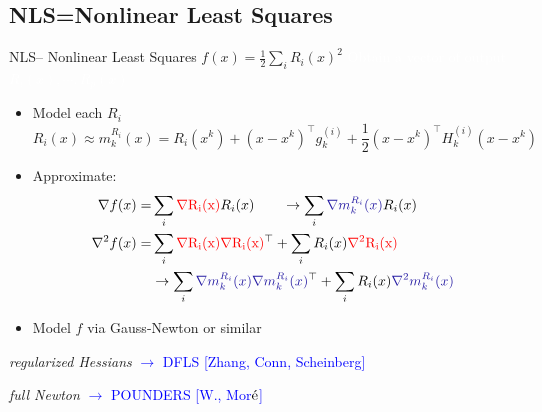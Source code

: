 \documentclass[handout,aspectratio=54]{beamer}
\numberwithin{theorem}{section}
\begin{document}
\subsection{NLS=Nonlinear Least Squares}
\begin{frame}{NLS– Nonlinear Least Squares $f(x)=\frac{1}{2}\sum_iR_i(x)^2$}
\colorbox[rgb]{0.5,0.6,0.7}{\textcolor{white}{Obtain a vector of output $R_i(x),\cdots,R_p(x)$}}

\begin{itemize}
\item Model each $R_i$
\begin{equation*}
R_i(x)\approx m_k^{R_i}(x)=R_i(x^k)+(x-x^k)^\top g_k^{(i)}+\frac{1}{2}(x-x^k)^\top H_k^{(i)}(x-x^k)
\end{equation*}
\item Approximate:
\begin{align*}
\nabla f(x) = &\sum_i\textcolor{red}{\rm\nabla R_i(x)}R_i(x)\qquad\rightarrow\sum_i\textcolor{blue}{\nabla m_k^{R_i}(x)}R_i(x)\\
\nabla^2 f(x) = &\sum_i\textcolor{red}{\rm\nabla R_i(x)\nabla R_i(x)}^\top+\sum_iR_i(x)\textcolor{red}{\rm\nabla^2R_i(x)}\\
&\rightarrow\sum_i\textcolor{blue}{\nabla m_k^{R_i}(x)\nabla m_k^{R_i}(x)}^\top+\sum_iR_i(x)\textcolor{blue}{\nabla^2m_k^{R_i}(x)}
\end{align*}
\item Model $f$ via Gauss-Newton or similar
\end{itemize}

\flushright\footnotesize
\emph{regularized Hessians} \textcolor{blue}{$\rightarrow$ DFLS [Zhang, Conn, Scheinberg]}

\emph{full Newton} \textcolor{blue}{$\rightarrow$ POUNDERS [W., Mor$\acute{\textup{e}}$]}
\end{frame}
\end{document}
